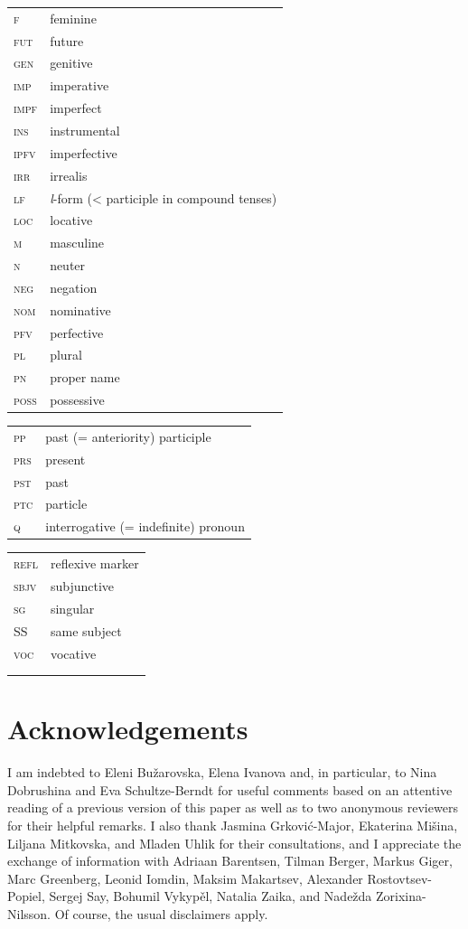 \documentclass[output=paper,colorlinks,citecolor=brown]{langscibook}
\begin{document}
\begin{tabularx}{.45\textwidth}{lQ}
\textsc{f} & feminine \\
\textsc{fut} & future \\
\textsc{gen} & genitive \\
\textsc{imp} & imperative \\
\textsc{impf} & imperfect \\
\textsc{ins} & instrumental \\
\textsc{ipfv} & imperfective \\
\textsc{irr} & irrealis \\
\textsc{lf} & \textit{l}-form (< participle in compound tenses) \\
\textsc{loc} & locative \\
\textsc{m} & masculine \\
\textsc{n} & neuter\\
\textsc{neg} & negation \\
\textsc{nom} & nominative \\
\textsc{pfv} & perfective \\
\textsc{pl} & plural \\
\textsc{pn} & proper name \\
\textsc{poss} & possessive \end{tabularx}%

\begin{tabularx}{.45\textwidth}{lQ}
\textsc{pp} & past (= anteriority) participle \\
\textsc{prs} & present \\
\textsc{pst} & past \\
\textsc{ptc} & particle\\
\textsc{q} & interrogative (= indefinite) pronoun  \end{tabularx}%
\begin{tabularx}{.45\textwidth}{lQ}
\textsc{refl} & reflexive marker \\ 
\textsc{sbjv} & subjunctive \\
\textsc{sg} & singular \\
SS & same subject \\
\textsc{voc} & vocative \\
\\\\
\end{tabularx}

\section*{Acknowledgements}
I am indebted to Eleni Bužarovska, Elena Ivanova and, in particular, to Nina Dobrushina and Eva Schultze-Berndt for useful comments based on an attentive reading of a previous version of this paper as well as to two anonymous reviewers for their helpful remarks. I also thank Jasmina Grković-Major, Ekaterina Mišina, Liljana Mitkovska, and Mladen Uhlik for their consultations, and I appreciate the exchange of information with Adriaan Barentsen, Tilman Berger, Markus Giger, Marc Greenberg, Leonid Iomdin, Maksim Makartsev, Alexander Rostovtsev-Popiel, Sergej Say, Bohumil Vykypěl, Natalia Zaika, and Nadežda Zorixina-Nilsson. Of course, the usual disclaimers apply.
\end{document}
